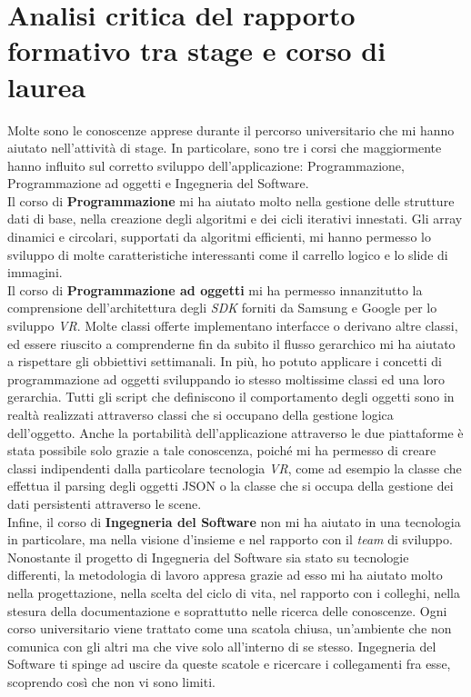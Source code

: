 \section{Analisi critica del rapporto formativo tra stage e corso di laurea}

Molte sono le conoscenze apprese durante il percorso universitario che mi hanno aiutato nell'attività di stage. In particolare, sono tre i corsi che maggiormente hanno influito sul corretto sviluppo dell'applicazione: Programmazione, Programmazione ad oggetti e Ingegneria del Software. \\
Il corso di \textbf{Programmazione} mi ha aiutato molto nella gestione delle strutture dati di base, nella creazione degli algoritmi e dei cicli iterativi innestati. Gli array dinamici e circolari, supportati da algoritmi efficienti, mi hanno permesso lo sviluppo di molte caratteristiche interessanti come il carrello logico e lo slide di immagini. \\
Il corso di \textbf{Programmazione ad oggetti} mi ha permesso innanzitutto la comprensione dell'architettura degli \textit{SDK} forniti da Samsung e Google per lo sviluppo \textit{VR}. Molte classi offerte implementano interfacce o derivano altre classi, ed essere riuscito a comprenderne fin da subito il flusso gerarchico mi ha aiutato a rispettare gli obbiettivi settimanali. In più, ho potuto applicare i concetti di programmazione ad oggetti sviluppando io stesso moltissime classi ed una loro gerarchia. Tutti gli script che definiscono il comportamento degli oggetti sono in realtà realizzati attraverso classi che si occupano della gestione logica dell'oggetto. Anche la portabilità dell'applicazione attraverso le due piattaforme è stata possibile solo grazie a tale conoscenza, poiché mi ha permesso di creare classi indipendenti dalla particolare tecnologia \textit{VR}, come ad esempio la classe che effettua il parsing degli oggetti JSON o la classe che si occupa della gestione dei dati persistenti attraverso le scene. \\
Infine, il corso di \textbf{Ingegneria del Software} non mi ha aiutato in una tecnologia in particolare, ma nella visione d'insieme e nel rapporto con il \textit{team} di sviluppo. Nonostante il progetto di Ingegneria del Software sia stato su tecnologie differenti, la metodologia di lavoro appresa grazie ad esso mi ha aiutato molto nella progettazione, nella scelta del ciclo di vita, nel rapporto con i colleghi, nella stesura della documentazione e soprattutto nelle ricerca delle conoscenze. Ogni corso universitario viene trattato come una scatola chiusa, un'ambiente che non comunica con gli altri ma che vive solo all'interno di se stesso. Ingegneria del Software ti spinge ad uscire da queste scatole e ricercare i collegamenti fra esse, scoprendo così che non vi sono limiti. \\
